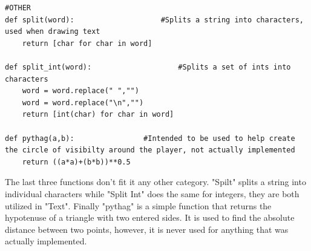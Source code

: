 \begin{lstlisting}
#OTHER
def split(word):                    #Splits a string into characters, used when drawing text
    return [char for char in word]

def split_int(word):                    #Splits a set of ints into characters
    word = word.replace(" ","")
    word = word.replace("\n","")
    return [int(char) for char in word]

def pythag(a,b):                #Intended to be used to help create the circle of visibilty around the player, not actually implemented
    return ((a*a)+(b*b))**0.5
\end{lstlisting}
The last three functions don't fit it any other category. "Spilt" splits a string into individual characters while "Split Int" does the same for integers, they are both utilized in "Text". Finally "pythag" is a simple function that returns the hypotenuse of a triangle with two entered sides. It is used to find the absolute distance between two points, however, it is never used for anything that was actually implemented.




































